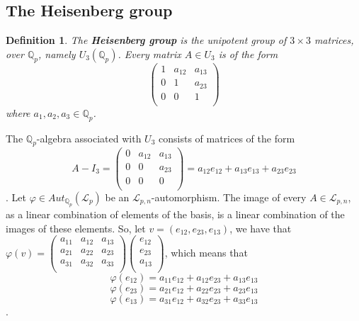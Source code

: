 \documentclass[12pt]{article}
\newtheorem{definition}[theorem]{Definition}
\begin{document}
\subsection{The Heisenberg group}
\begin{definition}
\label{def.heisenberg.group}
The \textbf{Heisenberg group} is the unipotent group of $3\times 3$ matrices, over $\mathbb{Q}_p$, namely $U_3(\mathbb{Q}_p)$. Every matrix $A\in U_3$ is of the form $$
\begin{pmatrix}
1 & a_{12} & a_{13}\\
0 & 1 & a_{23}\\
0 & 0 & 1\\
\end{pmatrix}
$$ where $a_1,a_2,a_3\in\mathbb{Q}_p$.
\end{definition}
The $\mathbb{Q}_p$-algebra associated with $U_3$ consists of matrices of the form $$A-I_3=
\begin{pmatrix}
0 & a_{12} & a_{13}\\
0 & 0 & a_{23}\\
0 & 0 & 0\\
\end{pmatrix}=a_{12}e_{12}+a_{13}e_{13}+a_{23}e_{23}
$$. Let $\varphi\in Aut_{\mathbb{Q}_p}(\mathcal{L}_p)$ be an $\mathcal{L}_{p,n}$-automorphism. The image of every $A\in\mathcal{L}_{p,n}$, as a linear combination of elements of the basis, is a linear combination of the images of these elements. So, let $v=(e_{12},e_{23},e_{13})$, we have that $\varphi(v)=\begin{pmatrix}
a_{11} & a_{12} & a_{13}\\
a_{21} & a_{22} & a_{23}\\
a_{31} & a_{32} & a_{33}\\
\end{pmatrix}\begin{pmatrix}
e_{12}\\
e_{23}\\
a_{13}\\
\end{pmatrix}
$, which means that $$
\varphi(e_{12})=a_{11}e_{12}+a_{12}e_{23}+a_{13}e_{13}$$
$$\varphi(e_{23})=a_{21}e_{12}+a_{22}e_{23}+a_{23}e_{13}$$
$$\varphi(e_{13})=a_{31}e_{12}+a_{32}e_{23}+a_{33}e_{13}
$$.
\end{document}
